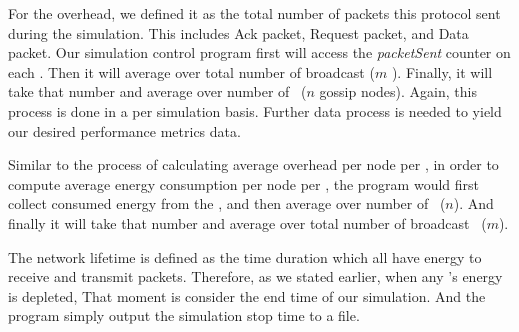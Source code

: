 For the overhead, we defined it as the total number of packets this protocol sent during the simulation. This includes Ack packet, Request packet, and Data packet. Our simulation control program first will access the \emph{packetSent} counter on each \gn. Then it will average over total number of broadcast \msgs ($m$ \msgs). Finally, it will take that number and average over number of \gns ~($n$ gossip nodes). Again, this process is done in a per simulation basis. Further data process is needed to yield our desired performance metrics data.

Similar to the process of calculating average overhead per node per \msg, in order to compute average energy consumption per node per \msg, the program would first collect consumed energy from the \gns, and then average over number of \gns ~($n$). And finally it will take that number and average over total number of broadcast \msgs ~($m$). 

The network lifetime is defined as the time duration which all \gns have energy to receive and transmit packets. Therefore, as we stated earlier, when any \gn's energy is depleted, That moment is consider the end time of our simulation. And the program simply output the simulation stop time to a file.
